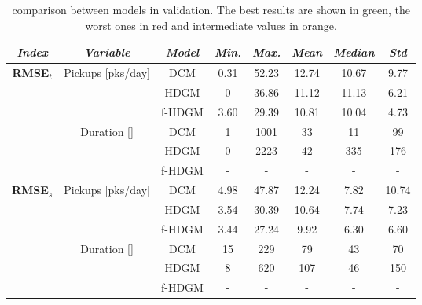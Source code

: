 \begin{table}[h!]
	\centering
	\renewcommand\arraystretch{1.3}
	\begin{tabular}{c|c|c|c|c|c|c|c}
		\hline
		\textit{Index} & \textit{Variable} & \textit{Model} & \textit{Min.} & \textit{Max.} & \textit{Mean} & \textit{Median} & \textit{Std}\\
		\hline
		\multirow{6}{4em}{\textbf{RMSE$_t$}} & \multirow{3}{4em}{Pickups [pks/day]} & DCM & \cellcolor{orange}\num{0.31} & \cellcolor{red}\num{52.23} & \cellcolor{red}\num{12.74} & \cellcolor{orange}\num{10.67} & \cellcolor{red}\num{9.77} \\ \cline{3-8}
		& & HDGM & \cellcolor{green}\num{0} & \cellcolor{orange}\num{36.86} & \cellcolor{orange}\num{11.12} & \cellcolor{red}\num{11.13} & \cellcolor{orange}\num{6.21} \\ \cline{3-8}
		& & f-HDGM & \cellcolor{red}\num{3.60} & \cellcolor{green}\num{29.39} & \cellcolor{green}\num{10.81} & \cellcolor{green}\num{10.04} & \cellcolor{green}\num{4.73} \\ \cline{2-8}
		& \multirow{3}{4em}{Duration [\si{\min}]} & DCM & \cellcolor{red}\num{1} & \cellcolor{green}\num{1001} & \cellcolor{green}\num{33} & \cellcolor{green}\num{11} & \cellcolor{green}\num{99} \\ \cline{3-8} 
		& & HDGM & \cellcolor{green}\num{0} & \cellcolor{red}\num{2223} & \cellcolor{red}\num{42} & \cellcolor{red}\num{335} & \cellcolor{red}\num{176} \\ \cline{3-8}
		& & f-HDGM & - & - & - & - & - \\
		\hline
		\multirow{6}{4em}{\textbf{RMSE$_s$}} & \multirow{3}{4em}{Pickups [pks/day]} & DCM & \cellcolor{red}\num{4.98} & \cellcolor{red}\num{47.87} & \cellcolor{red}\num{12.24} & \cellcolor{red}\num{7.82} & \cellcolor{red}\num{10.74} \\ \cline{3-8}
		& & HDGM & \cellcolor{orange}\num{3.54} & \cellcolor{orange}\num{30.39} & \cellcolor{orange}\num{10.64} & \cellcolor{orange}\num{7.74} & \cellcolor{orange}\num{7.23} \\ \cline{3-8}
		& & f-HDGM & \cellcolor{green}\num{3.44} & \cellcolor{green}\num{27.24} & \cellcolor{green}\num{9.92} & \cellcolor{green}\num{6.30} & \cellcolor{green}\num{6.60} \\ \cline{2-8}
		& \multirow{3}{4em}{Duration [\si{\min}]} & DCM & \cellcolor{red}\num{15} & \cellcolor{green}\num{229} & \cellcolor{green}\num{79} & \cellcolor{green}\num{43} & \cellcolor{green}\num{70} \\ \cline{3-8} 
		& & HDGM & \cellcolor{green}\num{8} & \cellcolor{red}\num{620} & \cellcolor{red}\num{107} & \cellcolor{red}\num{46} & \cellcolor{red}\num{150} \\ \cline{3-8}
		& & f-HDGM & - & - & - & - & - \\
		\hline
	\end{tabular}
	\caption[Comparison between models in validation]{comparison between models in validation. The best results are shown in green, the worst ones in red and intermediate values in orange.}
	\label{RMSE_final_comp}
\end{table}

